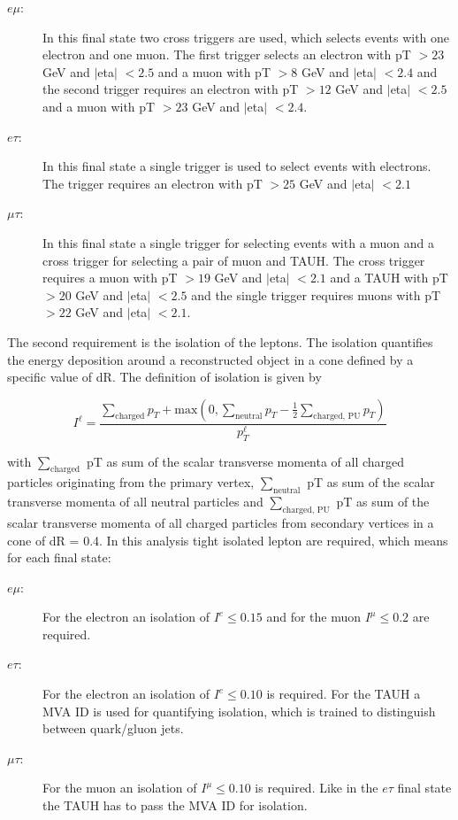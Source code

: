 \begin{description}
	\item [$e\mu$:] In this final state two cross triggers are used, which selects events with one electron and one muon. The first trigger selects an electron with \gls{pT} $> 23$ GeV and $|$\gls{eta}$|$ $< 2.5$ and a muon with \gls{pT} $> 8$ GeV and $|$\gls{eta}$|$ $< 2.4$ and the second trigger requires an electron with \gls{pT} $> 12$ GeV and $|$\gls{eta}$|$ $< 2.5$ and a muon with \gls{pT} $> 23$ GeV and $|$\gls{eta}$|$ $< 2.4$. 
	\item [$e\tau$:] In this final state a single trigger is used to select events with electrons. The trigger requires an electron with \gls{pT} $> 25$ GeV and $|$\gls{eta}$|$ $< 2.1$
	\item [$\mu\tau$:] In this final state a single trigger for selecting events with a muon and a cross trigger for selecting a pair of muon and \gls{TAUH}. The cross trigger requires a muon with \gls{pT} $> 19$ GeV and $|$\gls{eta}$|$ $< 2.1$ and a \gls{TAUH} with \gls{pT} $> 20$ GeV and $|$\gls{eta}$|$ $< 2.5$ and the single trigger requires muons with \gls{pT} $> 22$ GeV and $|$\gls{eta}$|$ $< 2.1$.
\end{description}

The second requirement is the isolation of the leptons. The isolation quantifies the energy deposition around a reconstructed object in a cone defined by a specific value of \gls{dR}. The definition of isolation is given by

\begin{equation}
	\label{eq:eq_3_1}
	I^{\ell} = \frac{\sum_{\text{charged}} p_{T} + \text{max}(0, \sum_{\text{neutral}} p_{T} - \frac{1}{2}\sum_{\text{charged, PU}} p_{T})}{p_T^{\ell}}  
\end{equation} 

with $\sum_{\text{charged}}$ \gls{pT} as sum of the scalar transverse momenta of all charged particles originating from the primary vertex, $\sum_{\text{neutral}}$ \gls{pT} as sum of the scalar transverse momenta of all neutral particles and $\sum_{\text{charged, PU}}$ \gls{pT} as sum of the scalar transverse momenta of all charged particles from secondary vertices in a cone of \gls{dR} = 0.4. In this analysis tight isolated lepton are required, which means for each final state: 

\begin{description}
	\item [$e\mu$:] For the electron an isolation of $I^{e} \leq  0.15$ and for the muon $I^{\mu} \leq  0.2$ are required. 
	\item [$e\tau$:]  For the electron an isolation of $I^{e} \leq  0.10$ is required. For the \gls{TAUH} a \gls{MVA} ID is used for quantifying isolation, which is trained to distinguish between quark/gluon jets. 
	\item [$\mu\tau$:]  For the muon an isolation of $I^{\mu} \leq 0.10$ is required. Like in the $e\tau$ final state the \gls{TAUH} has to pass the \gls{MVA} ID for isolation.
\end{description}


